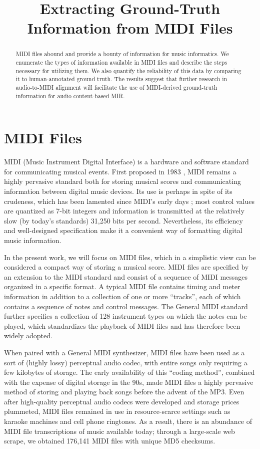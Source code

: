 \documentclass{article}
\title{Extracting Ground-Truth Information from MIDI Files}
\begin{document}
\maketitle

\begin{abstract}
MIDI files abound and provide a bounty of information for music informatics.
We enumerate the types of information available in MIDI files and describe the steps necessary for utilizing them.
We also quantify the reliability of this data by comparing it to human-annotated ground truth.
The results suggest that further research in audio-to-MIDI alignment will facilitate the use of MIDI-derived ground-truth information for audio content-based MIR.
\end{abstract}

\section{MIDI Files}\label{sec:introduction}

MIDI (Music Instrument Digital Interface) is a hardware and software standard for communicating musical events.
First proposed in 1983 \cite{international1983midi}, MIDI remains a highly pervasive standard both for storing musical scores and communicating information between digital music devices.
Its use is perhaps in spite of its crudeness, which has been lamented since MIDI's early days \cite{moore1988dysfunctions}; most control values are quantized as 7-bit integers and information is transmitted at the relatively slow (by today's standards) 31,250 bits per second.
Nevertheless, its efficiency and well-designed specification make it a convenient way of formatting digital music information.

In the present work, we will focus on MIDI files, which in a simplistic view can be considered a compact way of storing a musical score.
MIDI files are specified by an extension to the MIDI standard \cite{international1988standard} and consist of a sequence of MIDI messages organized in a specific format.
A typical MIDI file contains timing and meter information in addition to a collection of one or more ``tracks'', each of which contains a sequence of notes and control messages.
The General MIDI standard further specifies a collection of 128 instrument types on which the notes can be played, which standardizes the playback of MIDI files and has therefore been widely adopted.

When paired with a General MIDI synthesizer, MIDI files have been used as a sort of (highly lossy) perceptual audio codec, with entire songs only requiring a few kilobytes of storage.
The early availability of this ``coding method'', combined with the expense of digital storage in the 90s, made MIDI files a highly pervasive method of storing and playing back songs before the advent of the MP3.
Even after high-quality perceptual audio codecs were developed and storage prices plummeted, MIDI files remained in use in resource-scarce settings such as karaoke machines and cell phone ringtones.
As a result, there is an abundance of MIDI file transcriptions of music available today; through a large-scale web scrape, we obtained 176,141 MIDI files with unique MD5 checksums.
\end{document}
